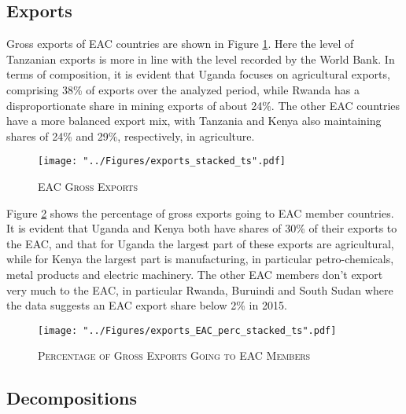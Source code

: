 \documentclass[a4paper]{article}
\begin{document}
\subsection{Exports}

Gross exports of EAC countries are shown in Figure \ref{fig:exp}. Here the level of Tanzanian exports is more in line with the level recorded by the World Bank. In terms of composition, it is evident that Uganda focuses on agricultural exports, comprising 38\% of exports over the analyzed period, while Rwanda has a disproportionate share in mining exports of about 24\%. The other EAC countries have a more balanced export mix, with Tanzania and Kenya also maintaining shares of 24\% and 29\%, respectively, in agriculture. 


\begin{figure}[h!]
\centering
\caption{\label{fig:exp}\textsc{EAC Gross Exports}}
\texttt{[image: "../Figures/exports\_stacked\_ts".pdf]} %
\end{figure}
\FloatBarrier

Figure \ref{fig:exp_EAC_share} shows the percentage of gross exports going to EAC member countries. It is evident that Uganda and Kenya both have shares of 30\% of their exports to the EAC, and that for Uganda the largest part of these exports are agricultural, while for Kenya the largest part is manufacturing, in particular petro-chemicals, metal products and electric machinery.  The other EAC members don't export very much to the EAC, in particular Rwanda, Buruindi and South Sudan where the data suggests an EAC export share below 2\% in 2015. 

\begin{figure}[h!]
\centering
\caption{\label{fig:exp_EAC_share}\textsc{Percentage of Gross Exports Going to EAC Members}}
\texttt{[image: "../Figures/exports\_EAC\_perc\_stacked\_ts".pdf]} %
\end{figure}
\FloatBarrier

\subsection{Decompositions}



\end{document}
